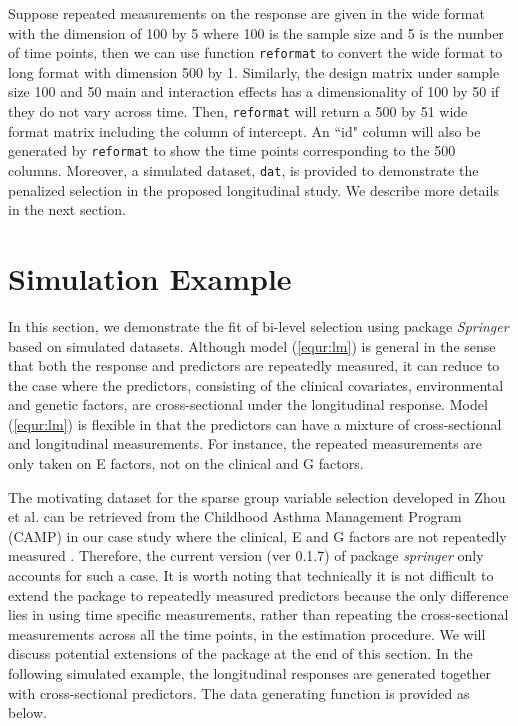 \documentclass[12pt]{article}
\begin{document}
Suppose repeated measurements on the response are given in the wide format with the dimension of 100 by 5 where 100 is the sample size and 5 is the number of time points, then we can use function \texttt{reformat} to convert the wide format to long format with dimension 500 by 1. Similarly, the design matrix under sample size 100 and 50 main and interaction effects has a dimensionality of 100 by 50 if they do not vary across time. Then, \texttt{reformat} will return a 500 by 51 wide format matrix including the column of intercept. An ``id" column will also be generated by \texttt{reformat} to show the time points corresponding to the 500 columns. Moreover, a simulated dataset, \texttt{dat}, is provided to demonstrate the penalized selection in the proposed longitudinal study. We describe more details in the next section.



\section{Simulation Example}

{\color{blue} In this section, we demonstrate the fit of bi-level selection using package \emph{Springer} based on simulated datasets. Although model (\ref{equr:lm}) is general in the sense that both the response and predictors are repeatedly measured, it can reduce to the case where the predictors, consisting of the clinical covariates, environmental and genetic factors, are cross-sectional under the longitudinal response. Model (\ref{equr:lm}) is flexible in that the predictors can have a mixture of cross-sectional and longitudinal measurements. For instance, the repeated measurements are only taken on E factors, not on the clinical and G factors.}

{\color{blue} The motivating dataset for the sparse group variable selection developed in Zhou et al. \cite{zhou2022sparse} can be retrieved from the Childhood Asthma Management Program (CAMP) in our case study where the clinical, E and G factors are not repeatedly measured \cite{CAMP1,CAMP2,Covar}. Therefore, the current version (ver 0.1.7) of package \emph{springer} only accounts for such a case. It is worth noting that technically it is not difficult to extend the package to repeatedly measured predictors because the only difference lies in using time specific measurements, rather than repeating the cross-sectional measurements across all the time points, in the estimation procedure. We will discuss potential extensions of the package at the end of this section. In the following simulated example,  the longitudinal responses are generated together with cross-sectional predictors. The data generating function is provided as below. }
\end{document}
